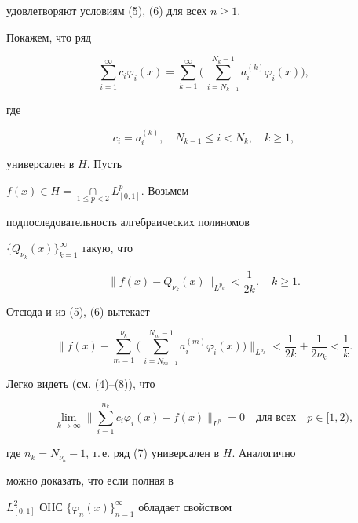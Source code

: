 удовлетворяют условиям (5), (6) для всех $n\ge1$. 


 


Покажем, что ряд 


\begin{equation} 


\sum^\infty_{i=1}c_i\varphi_i(x)=\sum^\infty_{k=1}\bigg(\, 


\sum^{N_k-1}_{i=N_{k-1}}a^{(k)}_i\varphi_i(x)\bigg), 


\end{equation} 


где 


\begin{equation} 


c_i=a^{(k)}_i,\quad N_{k-1}\le i<N_k,\quad k\ge1, 


\end{equation} 


универсален в $H$. Пусть 


$f(x)\in H=\mathop{\cap}\limits_{1\le p<2}L^p_{[0,1]}$. Возьмем 


подпоследовательность алгебраических полиномов 


$\{Q_{\nu_k}(x)\}^\infty_{k=1}$ такую, что 


$$ 


\|f(x)-Q_{\nu_k}(x)\|_{L^{p_k}}<\frac{1}{2k},\quad k\ge1. 


$$ 


Отсюда и из (5), (6) вытекает 


$$ 


\bigg\|f(x)-\sum^{\nu_k}_{m=1}\bigg(\, 


\sum^{N_m-1}_{i=N_{m-1}}a^{(m)}_i\varphi_i(x) \bigg)


\bigg\|_{L^{p_k}}<\frac{1}{2k}+\frac{1}{2\nu_k}<\frac{1}{k}. 


$$ 


Легко видеть (см. (4)--(8)), что 


$$ 


\lim_{k\to\infty}\bigg\|\sum^{n_k}_{i=1}c_i\varphi_i(x)-f(x) 


\bigg\|_{L^p}=0\quad\text{для всех}\quad p\in[1,2), 


$$ 


где $n_k=N_{\nu_k}-1$, т.\,е. ряд (7) универсален в $H$. Аналогично 


можно доказать, что если полная в 


$L^2_{[0,1]}$ ОНС $\{\varphi_n(x)\}^\infty_{n=1}$ обладает свойством 


